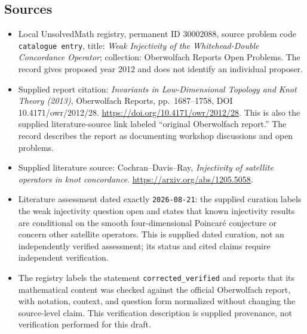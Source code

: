 \documentclass[11pt]{article}
\begin{document}
\subsection{Sources}
\begin{itemize}
\item Local UnsolvedMath registry, permanent ID \(30002088\), source problem code \texttt{catalogue entry}, title: \emph{Weak Injectivity of the Whitehead-Double Concordance Operator}; collection: Oberwolfach Reports Open Problems. The record gives proposed year 2012 and does not identify an individual proposer.
\item Supplied report citation: \emph{Invariants in Low-Dimensional Topology and Knot Theory (2013)}, Oberwolfach Reports, pp.\ 1687--1758, DOI 10.4171/owr/2012/28. \url{https://doi.org/10.4171/owr/2012/28}. This is also the supplied literature-source link labeled ``original Oberwolfach report.'' The record describes the report as documenting workshop discussions and open problems.
\item Supplied literature source: Cochran--Davis--Ray, \emph{Injectivity of satellite operators in knot concordance}. \url{https://arxiv.org/abs/1205.5058}.
\item Literature assessment dated exactly \texttt{2026-08-21}: the supplied curation labels the weak injectivity question open and states that known injectivity results are conditional on the smooth four-dimensional Poincar\'e conjecture or concern other satellite operators. This is supplied dated curation, not an independently verified assessment; its status and cited claims require independent verification.
\item The registry labels the statement \texttt{corrected\_verified} and reports that its mathematical content was checked against the official Oberwolfach report, with notation, context, and question form normalized without changing the source-level claim. This verification description is supplied provenance, not verification performed for this draft.
\end{itemize}
\end{document}
